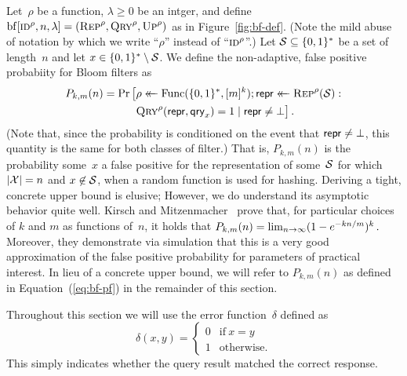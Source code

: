 Let~$\rho$ be a function, $\lambda\geq0$ be an intger, and define
$\mathrm{bf}[\textnormal{\textsc{id}}^\rho,n,\lambda] = (\textnormal{\textsc{Rep}}^\rho, \textnormal{\textsc{Qry}}^\rho, \textnormal{\textsc{Up}}^\rho)$ as in
Figure~\ref{fig:bf-def}. (Note the mild abuse of notation by which we write
``$\rho$'' instead of ``$\textnormal{\textsc{id}}^\rho$''.)
%
Let $\mathcal{S}\subseteq\{0,1\}^*$ be a set of length~$n$ and let
$x\in\{0,1\}^*\setminus\mathcal{S}$. We define the non-adaptive, false positive
probabiity for Bloom filters as
\begin{equation}\label{eq:bf-fp}
  \begin{aligned}
    P_{k,m}(n) =
      \Pr\big[&\rho \mathrel{\leftarrow\mkern-14mu\leftarrow} \mathrm{Func}(\{0,1\}^*,[m]^k);
              \mathsf{repr} \mathrel{\leftarrow\mkern-14mu\leftarrow} \textnormal{\textsc{Rep}}^\rho(\mathcal{S}): \\
              &\textnormal{\textsc{Qry}}^\rho(\mathsf{repr}, \mathsf{qry}_x) = 1 \mid \mathsf{repr} \ne \bot
      \big] \,.
  \end{aligned}
\end{equation}
%
(Note that, since the probability is conditioned on the event that
$\mathsf{repr}\ne\bot$, this quantity is the same for both classes of filter.)
%
That is, $P_{k,m}(n)$ is the probability some~$x$ a false positive for the
representation of some~$\mathcal{S}$ for which $|\mathcal{X}|=n$ and $x\not\in\mathcal{S}$, when a
random function is used for hashing.
%
Deriving a tight, concrete upper bound is elusive;  However, we do understand its asymptotic behavior
quite well. Kirsch and Mitzenmacher~\cite{kirsch2006less} prove that, for
particular choices of $k$ and $m$ as functions of~$n$, it holds that
$
  P_{k,m}(n) = \lim_{n{\rightarrow}\infty} (1-e^{-kn/m})^k \,.
$
%
Moreover, they demonstrate via simulation that this is a very good approximation
of the false positive probability for parameters of practical interest.
%
In lieu of a concrete upper bound, we will refer to $P_{k,m}(n)$ as defined in
Equation~(\ref{eq:bf-pf}) in the remainder of this section.

%
Throughout this section we will use the error function~$\delta$ defined as
\begin{equation}
  \delta(x, y) =
  \begin{cases}
    0 & \text{if}\ x=y \\
    1 & \text{otherwise.}
  \end{cases}
\end{equation}
This simply indicates whether the query result matched the correct response.

